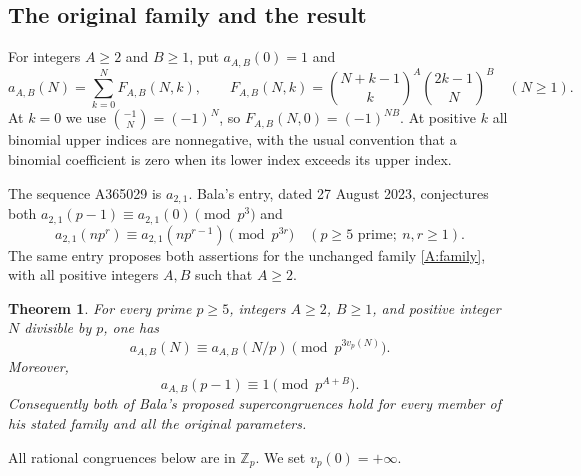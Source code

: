 \documentclass[11pt,a4paper]{article}
\newtheorem{theorem}{Theorem}[section]
\theoremstyle{remark}\newtheorem{remark}[theorem]{Remark}
\newcommand{\vp}{v_p}\newcommand{\Zp}{\mathbb Z_p}
\numberwithin{equation}{section}
\begin{document}
\subsection{The original family and the result}
For integers $A\ge2$ and $B\ge1$, put $a_{A,B}(0)=1$ and
\begin{equation}\label{A:family}
a_{A,B}(N)=\sum_{k=0}^{N} F_{A,B}(N,k),\qquad
F_{A,B}(N,k)=\binom{N+k-1}{k}^{\!A}\binom{2k-1}{N}^{\!B}
\quad(N\ge1).
\end{equation}
At $k=0$ we use $\binom{-1}{N}=(-1)^N$, so
$F_{A,B}(N,0)=(-1)^{NB}$. At positive $k$ all binomial upper indices
are nonnegative, with the usual convention that a binomial coefficient
is zero when its lower index exceeds its upper index.

The sequence A365029 is $a_{2,1}$. Bala's entry, dated 27 August 2023,
conjectures both $a_{2,1}(p-1)\equiv a_{2,1}(0)\pmod{p^3}$ and
\[
a_{2,1}(np^r)\equiv a_{2,1}(np^{r-1})\pmod{p^{3r}}
\quad(p\ge5\text{ prime};\ n,r\ge1).
\]
The same entry proposes both assertions for the unchanged family
\eqref{A:family}, with all positive integers $A,B$ such that $A\ge2$.

\begin{theorem}\label{A:main}
For every prime $p\ge5$, integers $A\ge2$, $B\ge1$, and positive
integer $N$ divisible by $p$, one has
\begin{equation}\label{A:strong}
a_{A,B}(N)\equiv a_{A,B}(N/p)\pmod{p^{3\vp(N)}}.
\end{equation}
Moreover,
\begin{equation}\label{A:boundary}
a_{A,B}(p-1)\equiv1\pmod{p^{A+B}}.
\end{equation}
Consequently both of Bala's proposed supercongruences hold for every
member of his stated family and all the original parameters.
\end{theorem}

All rational congruences below are in $\Zp$. We set $\vp(0)=+\infty$.
\end{document}
